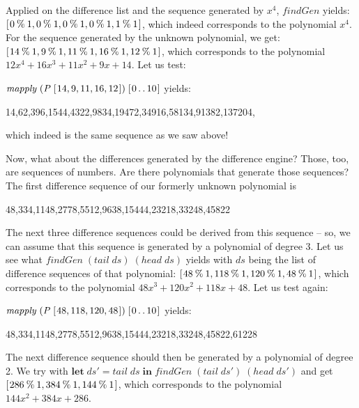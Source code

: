 \documentclass[tikz]{scrreprt}
\newcommand{\Conid}[1]{\mathit{#1}}
\newcommand{\Varid}[1]{\mathit{#1}}
\begin{document}
Applied on the difference list and the sequence
generated by $x^4$, \ensuremath{\Varid{findGen}} yields:
\ensuremath{[\mskip1.5mu \mathrm{0}\mathbin{\%}\mathrm{1},\mathrm{0}\mathbin{\%}\mathrm{1},\mathrm{0}\mathbin{\%}\mathrm{1},\mathrm{0}\mathbin{\%}\mathrm{1},\mathrm{1}\mathbin{\%}\mathrm{1}\mskip1.5mu]},
which indeed corresponds to the polynomial $x^4$. 
For the sequence generated by the unknown polynomial,
we get:
\ensuremath{[\mskip1.5mu \mathrm{14}\mathbin{\%}\mathrm{1},\mathrm{9}\mathbin{\%}\mathrm{1},\mathrm{11}\mathbin{\%}\mathrm{1},\mathrm{16}\mathbin{\%}\mathrm{1},\mathrm{12}\mathbin{\%}\mathrm{1}\mskip1.5mu]},
which corresponds to the polynomial
$12x^4 + 16x^3 + 11x^2 + 9x + 14$.
Let us test:

\ensuremath{\Varid{mapply}\;(\Conid{P}\;[\mskip1.5mu \mathrm{14},\mathrm{9},\mathrm{11},\mathrm{16},\mathrm{12}\mskip1.5mu])\;[\mskip1.5mu \mathrm{0}\mathinner{\ldotp\ldotp}\mathrm{10}\mskip1.5mu]} yields:

14,62,396,1544,4322,9834,19472,34916,58134,91382,137204,

which indeed is the same sequence as we saw above!

Now, what about the differences generated
by the difference engine? Those, too, are sequences
of numbers. Are there polynomials
that generate those sequences?
The first difference sequence of our formerly unknown polynomial is

48,334,1148,2778,5512,9638,15444,23218,33248,45822

The next three difference sequences could be derived
from this sequence -- so, we can assume that this sequence
is generated by a polynomial of degree 3. Let us see
what \ensuremath{\Varid{findGen}\;(\Varid{tail}\;\Varid{ds})\;(\Varid{head}\;\Varid{ds})} yields with \ensuremath{\Varid{ds}}
being the list of difference sequences of that polynomial:
\ensuremath{[\mskip1.5mu \mathrm{48}\mathbin{\%}\mathrm{1},\mathrm{118}\mathbin{\%}\mathrm{1},\mathrm{120}\mathbin{\%}\mathrm{1},\mathrm{48}\mathbin{\%}\mathrm{1}\mskip1.5mu]}, 
which corresponds to the polynomial 
$48x^3 + 120x^2 + 118x + 48$.
Let us test again:

\ensuremath{\Varid{mapply}\;(\Conid{P}\;[\mskip1.5mu \mathrm{48},\mathrm{118},\mathrm{120},\mathrm{48}\mskip1.5mu])\;[\mskip1.5mu \mathrm{0}\mathinner{\ldotp\ldotp}\mathrm{10}\mskip1.5mu]} yields:

48,334,1148,2778,5512,9638,15444,23218,33248,45822,61228

The next difference sequence should then be generated
by a polynomial of degree 2. We try with
\ensuremath{\mathbf{let}\;\Varid{ds'}\mathrel{=}\Varid{tail}\;\Varid{ds}\;\mathbf{in}\;\Varid{findGen}\;(\Varid{tail}\;\Varid{ds'})\;(\Varid{head}\;\Varid{ds'})} and get
\ensuremath{[\mskip1.5mu \mathrm{286}\mathbin{\%}\mathrm{1},\mathrm{384}\mathbin{\%}\mathrm{1},\mathrm{144}\mathbin{\%}\mathrm{1}\mskip1.5mu]},
which corresponds to the polynomial 
$144x^2 + 384x + 286$.
\end{document}
